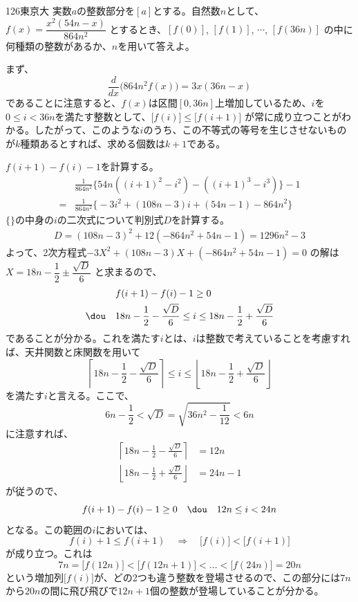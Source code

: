 \begin{prob}{126}{}{東京大}
 実数$a$の整数部分を$[a]$とする。自然数$n$として、$f(x)=\dfrac{x^2(54n-x)}{864n^2}$ とするとき、$[f(0)]$, $[f(1)]$, $\cdots$, $[f(36n)]$ の中に何種類の整数があるか、$n$を用いて答えよ。
\end{prob}

まず、
\[ \frac{d}{dx}\bigl(864n^2f(x)\bigr)=3x(36n-x) \]
であることに注意すると、$f(x)$は区間$[0,36n]$上増加しているため、$i$を$0\le i < 36n$を満たす整数として、$\bigl[f(i)\bigr] \le \bigl[f(i+1)\bigr]$ が常に成り立つことがわかる。したがって、このような$i$のうち、この不等式の等号を生じさせないものが$k$種類あるとすれば、求める個数は$k+1$である。

$f(i+1)-f(i)-1$を計算する。
\begin{align*}
 &\frac{1}{864n^2}\bigl\{54n( (i+1)^2-i^2 )-( (i+1)^3-i^3 )\bigr\} -1 \\
 =&\frac{1}{864n^2}\bigl\{-3i^2+(108n-3)i+(54n-1)-864n^2\bigr\}
\end{align*}
$\{{}\}$の中身の$i$の二次式について判別式$D$を計算する。
\begin{align*}
 D=(108n-3)^2+12(-864n^2+54n-1)=1296n^2-3
\end{align*}
よって、2次方程式$-3X^2+(108n-3)X+(-864n^2+54n-1)=0$ の解は$X=18n-\dfrac{1}{2}\pm\dfrac{\sqrt{D}}{6}$ と求まるので、
\begin{align*}
 &f(i+1)-f(i)-1\ge 0 \\
 \dou\quad & 18n-\frac{1}{2}-\frac{\sqrt{D}}{6}\le i\le 18n-\frac{1}{2}+\frac{\sqrt{D}}{6}
\end{align*}
であることが分かる。これを満たす$i$とは、$i$は整数で考えていることを考慮すれば、天井関数と床関数を用いて
\[ \left\lceil 18n-\frac{1}{2}-\frac{\sqrt{D}}{6}\right\rceil \le i\le \left\lfloor 18n-\frac{1}{2}+\frac{\sqrt{D}}{6}\right\rfloor \]
を満たす$i$と言える。ここで、
\[ 6n-\frac{1}{2} < \sqrt{D}=\sqrt{36n^2-\frac{1}{12}} < 6n \]
に注意すれば、
\begin{align*}
 \left\lceil 18n-\frac{1}{2}-\frac{\sqrt{D}}{6}\right\rceil &= 12n \\
 \left\lfloor 18n-\frac{1}{2}+\frac{\sqrt{D}}{6}\right\rfloor &= 24n-1
\end{align*}
が従うので、
\[ f(i+1)-f(i)-1 \ge 0 \quad\dou\quad 12n\le i < 24n \]
となる。この範囲の$i$においては、
\[ f(i)+1\le f(i+1) \quad\Rightarrow\quad \bigl[f(i)\bigr] < \bigl[f(i+1)\bigr] \]
が成り立つ。これは
\[ 7n=\bigl[f(12n)\bigr]<\bigl[f(12n+1)\bigr]<\dots <\bigl[f(24n)\bigr]=20n \]
という増加列$\bigl[f(i)\bigr]$が、どの2つも違う整数を登場させるので、この部分には$7n$から$20n$の間に飛び飛びで$12n+1$個の整数が登場していることが分かる。

